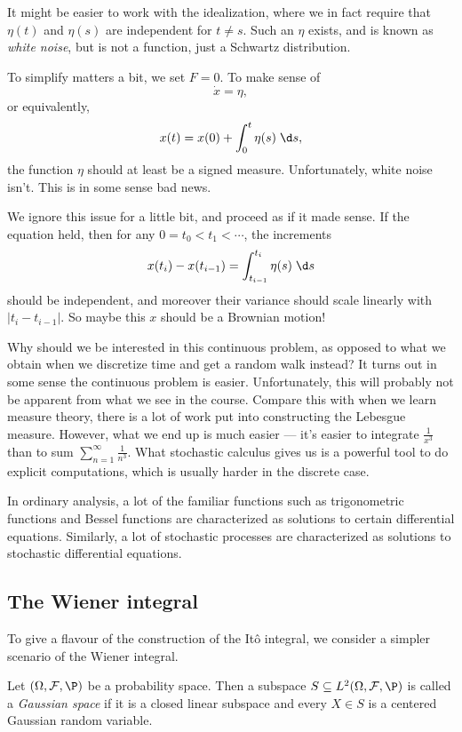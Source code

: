 \documentclass[a4paper]{article}
\begin{document}
It might be easier to work with the idealization, where we in fact require that $\eta(t)$ and $\eta(s)$ are independent for $t \not= s$. Such an $\eta$ exists, and is known as \emph{white noise}, but is not a function, just a Schwartz distribution.

To simplify matters a bit, we set $F = 0$. To make sense of
\[
  \dot{x} = \eta,
\]
or equivalently,
\[
  x(t) = x(0) + \int_0^t \eta(s)\;\d s,
\]
the function $\eta$ should at least be a signed measure. Unfortunately, white noise isn't. This is in some sense bad news.

We ignore this issue for a little bit, and proceed as if it made sense. If the equation held, then for any $0 = t_0 < t_1 < \cdots$, the increments
\[
  x(t_i) - x(t_{i - 1}) = \int_{t_{i - 1}}^{t_i} \eta(s) \;\d s
\]
should be independent, and moreover their variance should scale linearly with $|t_i - t_{i - 1}|$. So maybe this $x$ should be a Brownian motion!

Why should we be interested in this continuous problem, as opposed to what we obtain when we discretize time and get a random walk instead? It turns out in some sense the continuous problem is easier. Unfortunately, this will probably not be apparent from what we see in the course. Compare this with when we learn measure theory, there is a lot of work put into constructing the Lebesgue measure. However, what we end up is much easier --- it's easier to integrate $\frac{1}{x^3}$ than to sum $\sum_{n = 1}^\infty \frac{1}{n^3}$. What stochastic calculus gives us is a powerful tool to do explicit computations, which is usually harder in the discrete case.

In ordinary analysis, a lot of the familiar functions such as trigonometric functions and Bessel functions are characterized as solutions to certain differential equations. Similarly, a lot of stochastic processes are characterized as solutions to stochastic differential equations.

\subsection{The Wiener integral}
To give a flavour of the construction of the It\^o integral, we consider a simpler scenario of the Wiener integral.

\begin{defi}
  Let $(\Omega, \mathcal{F}, \P)$ be a probability space. Then a subspace $S \subseteq L^2(\Omega, \mathcal{F}, \P)$ is called a \emph{Gaussian space} if it is a closed linear subspace and every $X \in S$ is a centered Gaussian random variable.
\end{defi}
\end{document}
